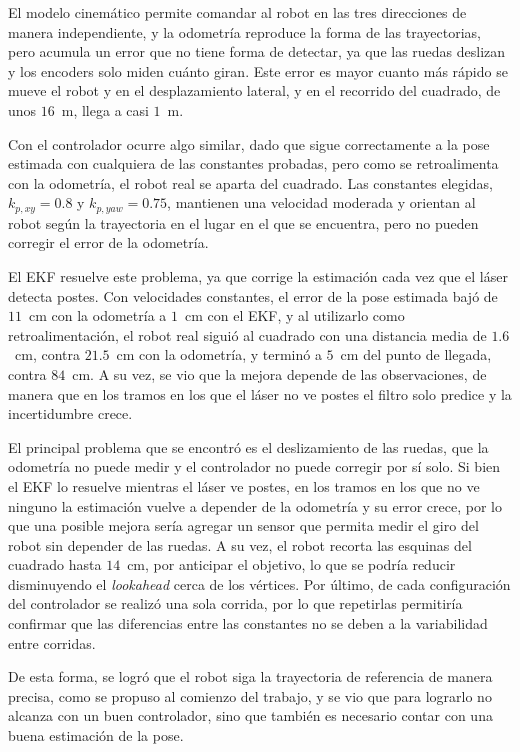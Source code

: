 \documentclass[11pt,a4paper]{article}
\begin{document}
El modelo cinemático permite comandar al robot en las tres direcciones de manera independiente, y la odometría reproduce la forma de las trayectorias, pero acumula un error que no tiene forma de detectar, ya que las ruedas deslizan y los encoders solo miden cuánto giran. Este error es mayor cuanto más rápido se mueve el robot y en el desplazamiento lateral, y en el recorrido del cuadrado, de unos $16$~m, llega a casi $1$~m.

Con el controlador ocurre algo similar, dado que sigue correctamente a la pose estimada con cualquiera de las constantes probadas, pero como se retroalimenta con la odometría, el robot real se aparta del cuadrado. Las constantes elegidas, $k_{p,xy} = 0.8$ y $k_{p,yaw} = 0.75$, mantienen una velocidad moderada y orientan al robot según la trayectoria en el lugar en el que se encuentra, pero no pueden corregir el error de la odometría.

El EKF resuelve este problema, ya que corrige la estimación cada vez que el láser detecta postes. Con velocidades constantes, el error de la pose estimada bajó de $11$~cm con la odometría a $1$~cm con el EKF, y al utilizarlo como retroalimentación, el robot real siguió al cuadrado con una distancia media de $1.6$~cm, contra $21.5$~cm con la odometría, y terminó a $5$~cm del punto de llegada, contra $84$~cm. A su vez, se vio que la mejora depende de las observaciones, de manera que en los tramos en los que el láser no ve postes el filtro solo predice y la incertidumbre crece.

El principal problema que se encontró es el deslizamiento de las ruedas, que la odometría no puede medir y el controlador no puede corregir por sí solo. Si bien el EKF lo resuelve mientras el láser ve postes, en los tramos en los que no ve ninguno la estimación vuelve a depender de la odometría y su error crece, por lo que una posible mejora sería agregar un sensor que permita medir el giro del robot sin depender de las ruedas. A su vez, el robot recorta las esquinas del cuadrado hasta $14$~cm, por anticipar el objetivo, lo que se podría reducir disminuyendo el \emph{lookahead} cerca de los vértices. Por último, de cada configuración del controlador se realizó una sola corrida, por lo que repetirlas permitiría confirmar que las diferencias entre las constantes no se deben a la variabilidad entre corridas.

De esta forma, se logró que el robot siga la trayectoria de referencia de manera precisa, como se propuso al comienzo del trabajo, y se vio que para lograrlo no alcanza con un buen controlador, sino que también es necesario contar con una buena estimación de la pose.
\end{document}
